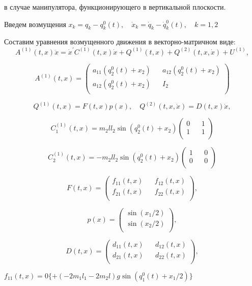 в случае манипулятора, функционирующего в вертикальной плоскости.

Введем возмущения $x_k = q_k - q_k^0(t), \quad \dot x_k = \dot q_k - \dot q_k^0(t), \quad k = 1, 2$

Составим уравнения возмущенного движения в векторно-матричном виде:
\begin{equation}
A^{(1)}(t, x) \ddot x = {\dot x^{'} C^{(1)}(t, x) \dot x} + Q^{(1)}(t,x) + Q^{(2)}(t, x, \dot x) + U^{(1)}, \label{2.2'}
\end{equation}

$$A^{(1)}(t, x) =
\begin{pmatrix}
a_{11} (q_2^0 (t) + x_2) && a_{12} (q_2^0 (t) + x_2) \\
a_{12} (q_2^0 (t) + x_2) && I_2 \\
\end{pmatrix}$$

$$Q^{(1)}(t,x)=F(t,x)p(x), \quad Q^{(2)}(t,x,\dot x)=D(t,x)\dot x, $$

$$C_1^{(1)}(t, x) = m_2 l l_2 \sin (q_2^0 (t) + x_2)
\begin{pmatrix}
0 && 1\\
1 && 1\\
\end{pmatrix}$$

$$C_2^{(1)}(t, x) = - m_2 l l_2 \sin (q_2^0 (t) + x_2)
\begin{pmatrix}
1 && 0\\
0 && 0\\
\end{pmatrix}$$

$$F(t, x) =
\begin{pmatrix}
f_{11}(t,x) && f_{12}(t,x) \\
f_{21}(t,x) && f_{22}(t,x)\\
\end{pmatrix},$$

$$p(x) =
\begin{pmatrix}
\sin(x_1/2) \\
\sin(x_2/2)\\
\end{pmatrix},$$

$$D(t, x) =
\begin{pmatrix}
d_{11} (t, x) && d_{12} (t, x) \\
d_{21} (t, x) && d_{22} (t, x) \\
\end{pmatrix},$$

$f_{11}(t,x) = 0 \{ + (- 2 m_1 l_1 - 2 m_2 l) g \sin (q_1^0 (t) + x_1 / 2) \}$

